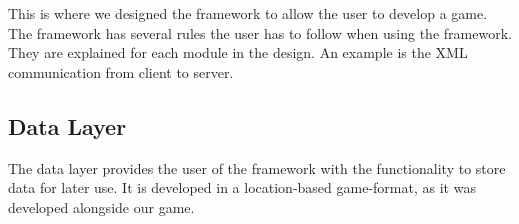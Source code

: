 This is where we designed the framework to allow the user to develop a game. The framework has several rules the user has to follow when using the framework. They are explained for each module in the design. An example is the XML communication from client to server.
 


\subsection{Data Layer}
The data layer provides the user of the framework with the functionality to store data for later use. It is developed in a location-based game-format, as it was developed alongside our game.



